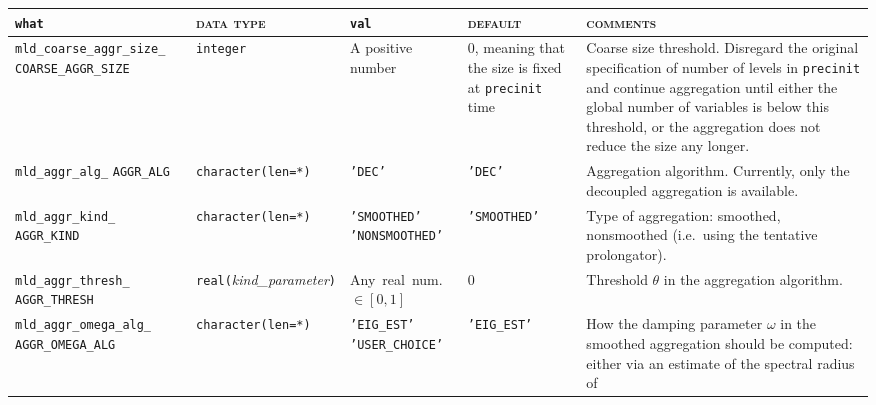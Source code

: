 \bsideways
\begin{center}
\begin{tabular}{|p{5cm}|l|p{2.4cm}|p{2.4cm}|p{6cm}|}
\hline
\verb|what|              & \textsc{data type}        &  \verb|val|      &  \textsc{default}  &
\textsc{comments} \\ \hline
\verb|mld_coarse_aggr_size_|  \break \verb|COARSE_AGGR_SIZE| & \verb|integer|
                         & A positive number
                         & 0, meaning that the size is fixed at
                         \verb|precinit| time
                         & Coarse size threshold. Disregard the
                         original specification of number of levels in
                         \verb|precinit| and continue aggregation
                         until either the global number of variables
                         is below this threshold, or the aggregation
                         does not reduce the size any longer. \\ \hline 
\verb|mld_aggr_alg_|  \break \verb|AGGR_ALG|  & \verb|character(len=*)|
                         & \texttt{'DEC'}
                         & \texttt{'DEC'}
                         & Aggregation algorithm. Currently, only the
                         decoupled aggregation is available. \\ \hline 
\verb|mld_aggr_kind_|  \break \verb|AGGR_KIND|  & \verb|character(len=*)|
                         & \texttt{'SMOOTHED'} \hspace{2.5cm} \texttt{'NONSMOOTHED'}
                         & \texttt{'SMOOTHED'}
                         & Type of aggregation: smoothed, nonsmoothed
                         (i.e.\ using the tentative prolongator). \\ \hline
\verb|mld_aggr_thresh_| \break \verb|AGGR_THRESH| & \verb|real(|\emph{kind\_parameter}\verb|)|
                         & Any~real~num. $\in [0, 1]$
                         & 0
                         & Threshold $\theta$ in the aggregation algorithm. \\ \hline
\verb|mld_aggr_omega_alg_|  \break \verb|AGGR_OMEGA_ALG|& \verb|character(len=*)|
                         & \texttt{'EIG\_EST'} \hspace{2.5cm} \texttt{'USER\_CHOICE'}
                         & \texttt{'EIG\_EST'}
                         & How the damping parameter $\omega$ in the
                         smoothed aggregation should be computed:
                         either via an estimate of the spectral radius of

\end{tabular}
\end{center}
